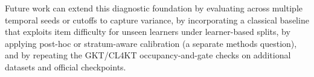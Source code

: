 Future work can extend this diagnostic foundation by evaluating across multiple temporal seeds or cutoffs to capture variance, by incorporating a classical baseline that exploits item difficulty for unseen learners under learner-based splits, by applying post-hoc or stratum-aware calibration (a separate methods question), and by repeating the GKT/CL4KT occupancy-and-gate checks on additional datasets and official checkpoints.
